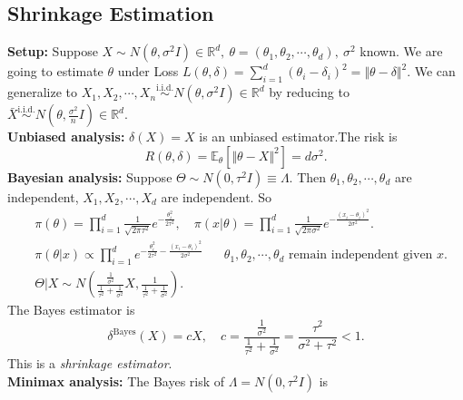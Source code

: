 \documentclass[a4paper]{article}
\begin{document}
\subsection{Shrinkage Estimation}
\textbf{Setup:} Suppose $X \sim N(\theta,\sigma^2 I) \in \mathbb{R}^d, \ \theta = (\theta_1,\theta_2,\cdots, \theta_d), \ \sigma^2$ known. We are going to estimate $\theta$ under Loss $L(\theta,\delta) = \sum\limits_{i=1}^d (\theta_i - \delta_i) ^2 = \Vert \theta - \delta \Vert ^2$. We can generalize to $X_1, X_2, \cdots,X_n \stackrel{\text{i.i.d.}}{\sim} N(\theta,\sigma^2I) \in \mathbb{R}^d$ by reducing to $\bar{X} \stackrel{\text{i.i.d.}}{\sim} N(\theta,\frac{\sigma^2}{n}I) \in \mathbb{R}^d.$\\
\newline
\textbf{Unbiased analysis:} $\delta(X) = X$ is an unbiased estimator.The risk is
\begin{equation}
	R(\theta,\delta) = \mathbb{E}_\theta[\Vert \theta - X \Vert ^2] = d \sigma^2.
\end{equation}
\newline
\textbf{Bayesian analysis:} Suppose $\Theta \sim N(0, \tau^2 I) \equiv \Lambda$. Then $\theta_1,\theta_2,\cdots,\theta_d$  are independent, $X_1, X_2, \cdots, X_d$ are independent. So
\begin{equation*}
	\begin{aligned}
		& \pi(\theta) = \prod\limits_{i=1}^d \frac{1}{\sqrt{2\pi\tau^2}} e^{-\frac{\theta_i^2}{2\tau^2}}, \quad \pi(x|\theta) = \prod\limits_{i=1}^d \frac{1}{\sqrt{2\pi\sigma^2}} e^{-\frac{(x_i - \theta_i)^2}{2\sigma^2}}.\\
		& \pi(\theta|x) \propto \prod\limits_{i=1}^d e^{-\frac{\theta_i^2}{2\tau^2} -\frac{(x_i - \theta_i)^2}{2\sigma^2}} \quad \text{ $\theta_1,\theta_2,\cdots,\theta_d$ remain independent given $x$}.\\
		& \Theta|X \sim N\left(\frac{\frac{1}{\sigma^2}}{\frac{1}{\tau^2} + \frac{1}{\sigma^2}} X, \frac{1}{\frac{1}{\tau^2} + \frac{1}{\sigma^2}}\right).
	\end{aligned}
\end{equation*}
	The Bayes estimator is
	\begin{equation}
		\delta^{\text{Bayes}}(X) = cX, \quad c = \frac{\frac{1}{\sigma^2}}{\frac{1}{\tau^2} + \frac{1}{\sigma^2}} = \frac{\tau^2}{\sigma^2+\tau^2} < 1.
	\end{equation}
	This is a \emph{shrinkage estimator}.\\
\newline
\textbf{Minimax analysis:} The Bayes risk of $\Lambda = N(0,\tau^2I)$ is
\end{document}
